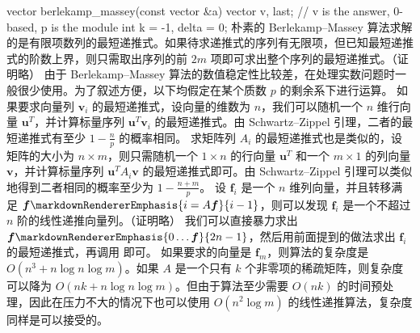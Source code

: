 {}vector berlekamp_massey(const vector &a) {\markdownRendererSoftLineBreak
{}vector v, last;  // v is the answer, 0-based, p is the module\markdownRendererSoftLineBreak
{}int k = -1, delta = 0;\markdownRendererInterblockSeparator
{}\markdownRendererInterblockSeparator
{}朴素的 Berlekamp–Massey 算法求解的是有限项数列的最短递推式。如果待求递推式的序列有无限项，但已知最短递推式的阶数上界，则只需取出序列的前 $2m$ 项即可求出整个序列的最短递推式。（证明略）\markdownRendererInterblockSeparator
{}
\markdownRendererSectionEnd \markdownRendererSectionBegin
{}\markdownRendererInterblockSeparator
{}由于 Berlekamp–Massey 算法的数值稳定性比较差，在处理实数问题时一般很少使用。为了叙述方便，以下均假定在某个质数 $p$ 的剩余系下进行运算。\markdownRendererInterblockSeparator
{}\markdownRendererSectionBegin
{}\markdownRendererInterblockSeparator
{}如果要求向量列 $\boldsymbol{v}_i$ 的最短递推式，设向量的维数为 $n$，我们可以随机一个 $n$ 维行向量 $\mathbf u^T$，并计算标量序列 ${\boldsymbol{u}^T\boldsymbol{v}_i}$ 的最短递推式。由 Schwartz–Zippel 引理，二者的最短递推式有至少 $1 - \frac n p$ 的概率相同。\markdownRendererParagraphSeparator
{}求矩阵列 ${A_i}$ 的最短递推式也是类似的，设矩阵的大小为 $n \times m$，则只需随机一个 $1 \times n$ 的行向量 $\mathbf u^T$ 和一个 $m \times 1$ 的列向量 $\boldsymbol{v}$，并计算标量序列 ${\boldsymbol{u}^T A_i \boldsymbol{v}}$ 的最短递推式即可。由 Schwartz–Zippel 引理可以类似地得到二者相同的概率至少为 $1 - \frac{n + m} p$。\markdownRendererInterblockSeparator
{}
\markdownRendererSectionEnd \markdownRendererSectionBegin
{}\markdownRendererInterblockSeparator
{}设 $\boldsymbol{f}_i$ 是一个 $n$ 维列向量，并且转移满足 $\boldsymbol{f}\markdownRendererEmphasis{i = A \boldsymbol{f}}{i - 1}$，则可以发现 ${\boldsymbol{f}_i}$ 是一个不超过 $n$ 阶的线性递推向量列。（证明略）\markdownRendererParagraphSeparator
{}我们可以直接暴力求出 $\boldsymbol{f}\markdownRendererEmphasis{0 \dots \boldsymbol{f}}{2n - 1}$，然后用前面提到的做法求出 ${\boldsymbol{f}_i}$ 的最短递推式，再调用  即可。\markdownRendererParagraphSeparator
{}如果要求的向量是 $\boldsymbol{f}_m$，则算法的复杂度是 $O(n^3 + n\log n \log m)$。如果 $A$ 是一个只有 $k$ 个非零项的稀疏矩阵，则复杂度可以降为 $O(nk + n\log n \log m)$。但由于算法至少需要 $O(nk)$ 的时间预处理，因此在压力不大的情况下也可以使用 $O(n^2 \log m)$ 的线性递推算法，复杂度同样是可以接受的。\markdownRendererInterblockSeparator
}
